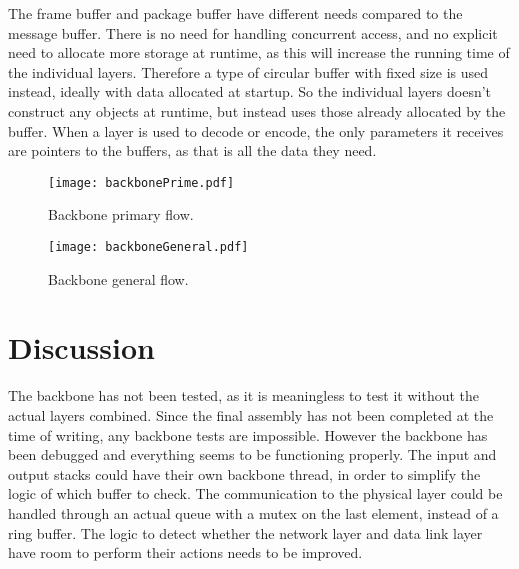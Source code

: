 The frame buffer and package buffer have different needs compared to the message buffer. There is no need for handling concurrent access, and no explicit need to allocate more storage at runtime, as this will increase the running time of the individual layers.
Therefore a type of circular buffer with fixed size is used instead, ideally with data allocated at startup. So the individual layers doesn't construct any objects at runtime, but instead uses those already allocated by the buffer.
When a layer is used to decode or encode, the only parameters it receives are pointers to the buffers, as that is all the data they need.

\begin{figure}[htb]
	\begin{center}
	\texttt{[image: backbonePrime.pdf]}
	\caption{Backbone primary flow.}	

	\label{fig:backboneprime}	
	\end{center}
\end{figure}

\begin{figure}[htb]
	\begin{center}
	\texttt{[image: backboneGeneral.pdf]}
	\caption{Backbone general flow.}
	\label{fig:backbonegeneral}	
	\end{center}
\end{figure}

\section{Discussion}
The backbone has not been tested, as it is meaningless to test it without the actual layers combined. Since the final assembly has not been completed at the time of writing, any backbone tests are impossible. However the backbone has been debugged and everything seems to be functioning properly.
The input and output stacks could have their own backbone thread, in order to simplify the logic of which buffer to check. The communication to the physical layer could be handled through an actual queue with a mutex on the last element, instead of a ring buffer. The logic to detect whether the network layer and data link layer have room to perform their actions needs to be improved.